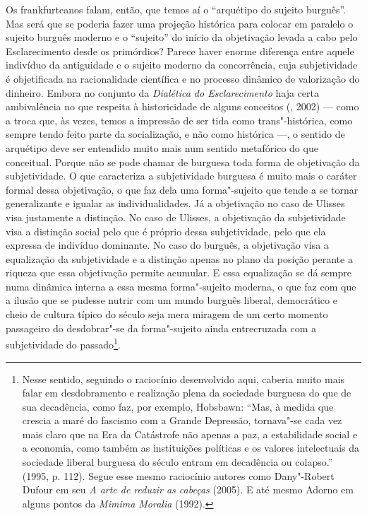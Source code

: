 Os frankfurteanos falam, então, que temos aí o ``arquétipo do sujeito
burguês''. Mas será que se poderia fazer uma projeção histórica para
colocar em paralelo o sujeito burguês moderno e o ``sujeito'' do início
da objetivação levada a cabo pelo Esclarecimento desde os primórdios?
Parece haver enorme diferença entre aquele indivíduo da antiguidade e o
sujeito moderno da concorrência, cuja subjetividade é objetificada na
racionalidade científica e no processo dinâmico de valorização do
dinheiro. Embora no conjunto da \emph{Dialética do Esclarecimento} haja
certa ambivalência no que respeita à historicidade de alguns conceitos
(, 2002) --- como a troca que, às vezes, temos a impressão de ser
tida como trans"-histórica, como sempre tendo feito parte da
socialização, e não como histórica ---, o sentido de arquétipo deve ser
entendido muito mais num sentido metafórico do que conceitual. Porque
não se pode chamar de burguesa toda forma de objetivação da
subjetividade. O que caracteriza a subjetividade burguesa é muito mais o
caráter formal dessa objetivação, o que faz dela uma forma"-sujeito que
tende a se tornar generalizante e igualar as individualidades. Já a
objetivação no caso de Ulisses visa justamente a distinção. No
caso de Ulisses, a objetivação da subjetividade visa a distinção social
pelo que é próprio dessa subjetividade, pelo que ela expressa de
indivíduo dominante. No caso do burguês, a objetivação visa a
equalização da subjetividade e a distinção apenas no plano da posição
perante a riqueza que essa objetivação permite acumular. E essa
equalização se dá sempre numa dinâmica interna a essa mesma
forma"-sujeito moderna, o que faz com que a ilusão que se pudesse nutrir
com um mundo burguês liberal, democrático e cheio de cultura típico do
século  seja mera miragem de um certo momento passageiro do
desdobrar"-se da forma"-sujeito ainda entrecruzada com a subjetividade do
passado\footnote{Nesse sentido, seguindo o raciocínio desenvolvido aqui,
  caberia muito mais falar em desdobramento e realização plena da
  sociedade burguesa do que de sua decadência, como faz, por exemplo,
  Hobsbawn: ``Mas, à medida que crescia a maré do fascismo com a Grande
  Depressão, tornava"-se cada vez mais claro que na Era da Catástrofe
  não apenas a paz, a estabilidade social e a economia, como também as
  instituições políticas e os valores intelectuais da sociedade liberal
  burguesa do século  entram em decadência ou colapso.'' (1995, p.
  112). Segue esse mesmo raciocínio autores como Dany"-Robert Dufour em
  seu \emph{A arte de reduzir as cabeças} (2005). E até mesmo
  Adorno em alguns pontos da \emph{Mimima Moralia} (1992).}.

